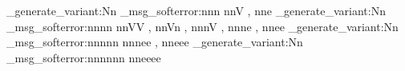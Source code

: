 \cs_generate_variant:Nn \zutil_msg_softerror:nnn
  { nnV , nne }
\cs_generate_variant:Nn \zutil_msg_softerror:nnnn
  { nnVV , nnVn , nnnV , nnne , nnee }
\cs_generate_variant:Nn \zutil_msg_softerror:nnnnn
  { nnnee , nneee }
\cs_generate_variant:Nn \zutil_msg_softerror:nnnnnn
  { nneeee }
